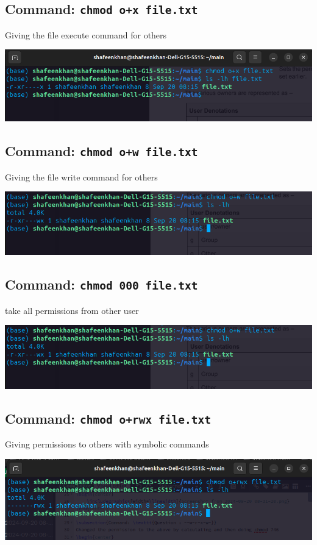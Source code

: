 \documentclass[a4paper,12pt]{article}
\begin{document}
\subsection{Command: \texttt{chmod o+x file.txt}}
Giving the file execute command for others 
\begin{center}
    \includegraphics[width=\linewidth]{Screenshot from 2024-09-20 08-57-44.png}
\end{center}

\subsection{Command: \texttt{chmod o+w file.txt}}
Giving the file write command for others 
\begin{center}
    \includegraphics[width=\linewidth]{Screenshot from 2024-09-20 08-59-03.png}
\end{center}

\subsection{Command: \texttt{chmod 000 file.txt}}
take all permissions from other user
\begin{center}
    \includegraphics[width=\linewidth]{Screenshot from 2024-09-20 08-59-03.png}
\end{center}

\subsection{Command: \texttt{chmod o+rwx file.txt}}
Giving permissions to others with symbolic commands
\begin{center}
    \includegraphics[width=\linewidth]{Screenshot from 2024-09-20 09-02-42.png}
\end{center}
\end{document}
